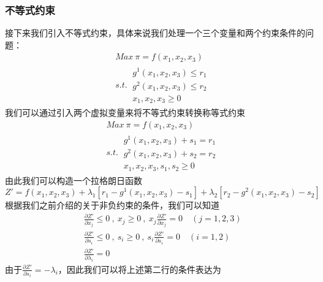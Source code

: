 \documentclass[UTF8,12pt]{ctexart}
\numberwithin{equation}{section} %
\numberwithin{figure}{section}
\numberwithin{table}{section}
\begin{document}
	\subsubsection{不等式约束}
	接下来我们引入不等式约束，具体来说我们处理一个三个变量和两个约束条件的问题：
	\begin{equation}
		\begin{aligned}
			&Max \ \pi = f(x_1,x_2,x_3) \\
			&s.t. \ 
			\begin{array}{l}
				g^1(x_1,x_2,x_3) \leqslant r_1 \\
				g^2(x_1,x_2,x_3) \leqslant r_2 \\
				x_1,x_2,x_3 \geqslant 0
			\end{array}
		\end{aligned}
	\end{equation}
	我们可以通过引入两个虚拟变量来将不等式约束转换称等式约束
	\begin{equation}
		\begin{aligned}
			&Max \ \pi = f(x_1,x_2,x_3) \\
			&s.t. \ 
			\begin{array}{l}
				g^1(x_1,x_2,x_3) + s_1 = r_1 \\
				g^2(x_1,x_2,x_3) + s_2 = r_2 \\
				x_1,x_2,x_3,s_1,s_2 \geqslant 0
			\end{array}
		\end{aligned}
	\end{equation}
	由此我们可以构造一个拉格朗日函数
	\begin{equation}
		Z' = f(x_1,x_2,x_3) + \lambda_1[r_1 - g^1(x_1,x_2,x_3) - s_1] + \lambda_2[r_2 - g^2(x_1,x_2,x_3) - s_2]
	\end{equation}
	根据我们之前介绍的关于非负约束的条件，我们可以知道
	\begin{equation}
		\begin{aligned}
			&\frac{\partial Z'}{\partial x_j} \leqslant 0 \ , \ x_j \geqslant 0 \ , \ x_j\frac{\partial Z'}{\partial x_j} = 0 \quad (j = 1,2,3)\\
			&\frac{\partial Z'}{\partial s_i} \leqslant 0 \ , \ s_i \geqslant 0 \ , \ s_i\frac{\partial Z'}{\partial s_i} = 0 \quad (i = 1,2)\\
			&\frac{\partial Z'}{\partial \lambda_i} = 0
		\end{aligned}
		\label{three condition}
	\end{equation}
	由于$\frac{\partial Z'}{\partial s_i} = -\lambda_i$，因此我们可以将上述第二行的条件表达为
\end{document}
